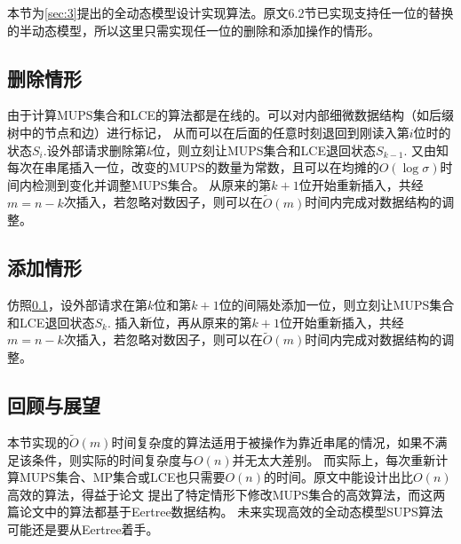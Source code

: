 
本节为\ref{sec:3}提出的全动态模型设计实现算法。原文6.2节已实现支持任一位的替换的半动态模型，所以这里只需实现任一位的删除和添加操作的情形。

\subsection{删除情形}\label{subsec:del}

由于计算MUPS集合\cite{Manacher75}和LCE\cite{Ukkonen95}的算法都是在线的。可以对内部细微数据结构（如后缀树中的节点和边）进行标记，
从而可以在后面的任意时刻退回到刚读入第$i$位时的状态$S_i$.设外部请求删除第$k$位，则立刻让MUPS集合和LCE退回状态$S_{k-1}$.
又由\cite{Mieno2022}知每次在串尾插入一位，改变的MUPS的数量为常数，且可以在均摊的$O(\log\sigma)$时间内检测到变化并调整MUPS集合。
从原来的第$k+1$位开始重新插入，共经$m = n - k$次插入，若忽略对数因子，则可以在$\tilde{O}(m)$时间内完成对数据结构的调整。

\subsection{添加情形}\label{subsec:add}

仿照\ref{subsec:del}，设外部请求在第$k$位和第$k+1$位的间隔处添加一位，则立刻让MUPS集合和LCE退回状态$S_{k}$.
插入新位，再从原来的第$k+1$位开始重新插入，共经$m = n - k$次插入，若忽略对数因子，则可以在$\tilde{O}(m)$时间内完成对数据结构的调整。

\subsection{回顾与展望}\label{subsec:future}

本节实现的$\tilde{O}(m)$时间复杂度的算法适用于被操作为靠近串尾的情况，如果不满足该条件，则实际的时间复杂度与$O(n)$并无太大差别。
而实际上，每次重新计算MUPS集合、MP集合或LCE也只需要$O(n)$的时间。原文中能设计出比$O(n)$高效的算法，得益于论文\cite{Mieno2022,Mieno2021}
提出了特定情形下修改MUPS集合的高效算法，而这两篇论文中的算法都基于Eertree\cite{RubinchikS18}数据结构。
未来实现高效的全动态模型SUPS算法可能还是要从Eertree着手。
